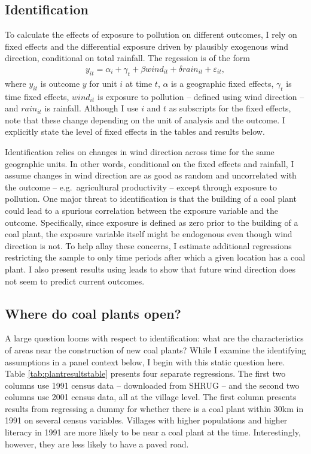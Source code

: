 \documentclass[
]{article}
\begin{document}
\hypertarget{identification}{%
\subsection{\texorpdfstring{Identification \label{identification}}{Identification }}\label{identification}}

To calculate the effects of exposure to pollution on different outcomes, I rely on fixed effects and the differential exposure driven by plausibly exogenous wind direction, conditional on total rainfall. The regession is of the form
\begin{gather} y_{it} = \alpha_{i} + \gamma_{t} + \beta wind_{it} + \delta rain_{it} + \varepsilon_{it}, \end{gather}
where \(y_{it}\) is outcome \(y\) for unit \(i\) at time \(t\), \(\alpha\) is a geographic fixed effects, \(\gamma_t\) is time fixed effects, \(wind_{it}\) is exposure to pollution -- defined using wind direction -- and \(rain_{it}\) is rainfall. Although I use \(i\) and \(t\) as subscripts for the fixed effects, note that these change depending on the unit of analysis and the outcome. I explicitly state the level of fixed effects in the tables and results below.

Identification relies on changes in wind direction across time for the same geographic units. In other words, conditional on the fixed effects and rainfall, I assume changes in wind direction are as good as random and uncorrelated with the outcome -- e.g.~agricultural productivity -- except through exposure to pollution. One major threat to identification is that the building of a coal plant could lead to a spurious correlation between the exposure variable and the outcome. Specifically, since exposure is defined as zero prior to the building of a coal plant, the exposure variable itself might be endogenous even though wind direction is not. To help allay these concerns, I estimate additional regressions restricting the sample to only time periods after which a given location has a coal plant. I also present results using leads to show that future wind direction does not seem to predict current outcomes.

\hypertarget{where-do-coal-plants-open}{%
\subsection{Where do coal plants open?}\label{where-do-coal-plants-open}}

A large question looms with respect to identification: what are the characteristics of areas near the construction of new coal plants? While I examine the identifying assumptions in a panel context below, I begin with this static question here. Table \ref{tab:plantresultstable} presents four separate regressions. The first two columns use 1991 census data -- downloaded from SHRUG -- and the second two columns use 2001 census data, all at the village level. The first column presents results from regressing a dummy for whether there is a coal plant within 30km in 1991 on several census variables. Villages with higher populations and higher literacy in 1991 are more likely to be near a coal plant at the time. Interestingly, however, they are less likely to have a paved road.
\end{document}
